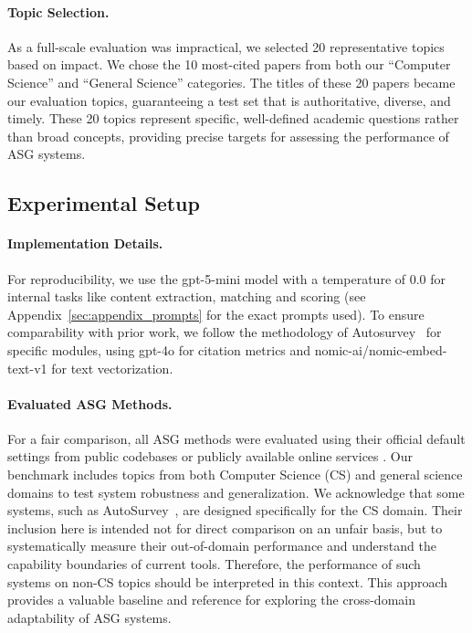 \documentclass[11pt]{article}
\begin{document}
\paragraph{Topic Selection.} As a full-scale evaluation was impractical, we selected 20 representative topics based on impact. We chose the 10 most-cited papers from both our ``Computer Science'' and ``General Science'' categories. The titles of these 20 papers became our evaluation topics, guaranteeing a test set that is authoritative, diverse, and timely. These 20 topics represent specific, well-defined academic questions rather than broad concepts, providing precise targets for assessing the performance of ASG systems.






\subsection{Experimental Setup}

\paragraph{Implementation Details.} For reproducibility, we use the gpt-5-mini model with a temperature of $0.0$ for internal tasks like content extraction, matching and scoring (see Appendix~\ref{sec:appendix_prompts} for the exact prompts used).
To ensure comparability with prior work, we follow the methodology of Autosurvey~\cite{wang2024autosurvey} for specific modules, using gpt-4o for citation metrics and nomic-ai/nomic-embed-text-v1 for text vectorization.

\paragraph{Evaluated ASG Methods.}
For a fair comparison, all ASG methods were evaluated using their official default settings from public codebases \citep{wang2024autosurvey, yan2025surveyforge} or publicly available online services \citep{liang2025surveyx, wang2025llmmapreducev2}. Our benchmark includes topics from both Computer Science (CS) and general science domains to test system robustness and generalization. We acknowledge that some systems, such as AutoSurvey~\cite{wang2024autosurvey}, are designed specifically for the CS domain. Their inclusion here is intended not for direct comparison on an unfair basis, but to systematically measure their out-of-domain performance and understand the capability boundaries of current tools. Therefore, the performance of such systems on non-CS topics should be interpreted in this context. This approach provides a valuable baseline and reference for exploring the cross-domain adaptability of ASG systems.
\end{document}
